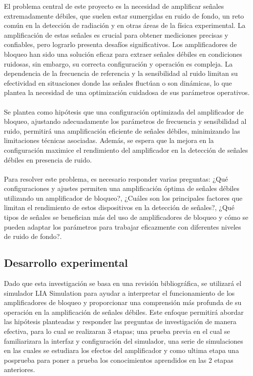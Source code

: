El problema central de este proyecto es la necesidad de amplificar señales extremadamente débiles, que suelen estar sumergidas en ruido de fondo, un reto común en la detección de radiación y en otras áreas de la física experimental. La amplificación de estas señales es crucial para obtener mediciones precisas y confiables, pero lograrlo presenta desafíos significativos. Los amplificadores de bloqueo han sido una solución eficaz para extraer señales débiles en condiciones ruidosas, sin embargo, su correcta configuración y operación es compleja. La dependencia de la frecuencia de referencia y la sensibilidad al ruido limitan su efectividad en situaciones donde las señales fluctúan o son dinámicas, lo que plantea la necesidad de una optimización cuidadosa de sus parámetros operativos.\\
\\
Se plantea como hipótesis que una configuración optimizada del amplificador de bloqueo, ajustando adecuadamente los parámetros de frecuencia y sensibilidad al ruido, permitirá una amplificación eficiente de señales débiles, minimizando las limitaciones técnicas asociadas. Además, se espera que la mejora en la configuración maximice el rendimiento del amplificador en la detección de señales débiles en presencia de ruido.\\
\\
Para resolver este problema, es necesario responder varias preguntas: ¿Qué configuraciones y ajustes permiten una amplificación óptima de señales débiles utilizando un amplificador de bloqueo?, ¿Cuáles son los principales factores que limitan el rendimiento de estos dispositivos en la detección de señales?, ¿Qué tipos de señales se benefician más del uso de amplificadores de bloqueo y cómo se pueden adaptar los parámetros para trabajar eficazmente con diferentes niveles de ruido de fondo?.




\subsection*{Desarrollo experimental}

Dado que esta investigación se basa en una revisión bibliográfica, se utilizará el simulador LIA Simulation para ayudar a interpretar el funcionamiento de los amplificadores de bloqueo y proporcionar una comprensión más profunda de su operación en la amplificación de señales débiles. Este enfoque permitirá abordar las hipótesis planteadas y responder las preguntas de investigación de manera efectiva, para lo cual se realizaran 3 etapas; una prueba previa en el cual se familiarizara la interfaz y configuración del simulador, una serie de simulaciones en las cuales se estudiara los efectos del amplificador y como ultima etapa una posprueba para poner a prueba los conocimientos aprendidos en las 2 etapas anteriores. 

